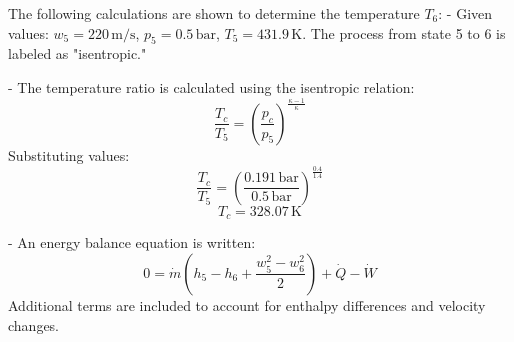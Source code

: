 The following calculations are shown to determine the temperature \( T_6 \):  
- Given values:  
  \( w_5 = 220 \, \text{m/s} \), \( p_5 = 0.5 \, \text{bar} \), \( T_5 = 431.9 \, \text{K} \).  
  The process from state 5 to 6 is labeled as "isentropic."  

- The temperature ratio is calculated using the isentropic relation:  
  \[
  \frac{T_c}{T_5} = \left( \frac{p_c}{p_5} \right)^{\frac{\kappa - 1}{\kappa}}
  \]  
  Substituting values:  
  \[
  \frac{T_c}{T_5} = \left( \frac{0.191 \, \text{bar}}{0.5 \, \text{bar}} \right)^{\frac{0.4}{1.4}}
  \]  
  \[
  T_c = 328.07 \, \text{K}
  \]  

- An energy balance equation is written:  
  \[
  0 = \dot{m} \left( h_5 - h_6 + \frac{w_5^2 - w_6^2}{2} \right) + \dot{Q} - \dot{W}
  \]  
  Additional terms are included to account for enthalpy differences and velocity changes.